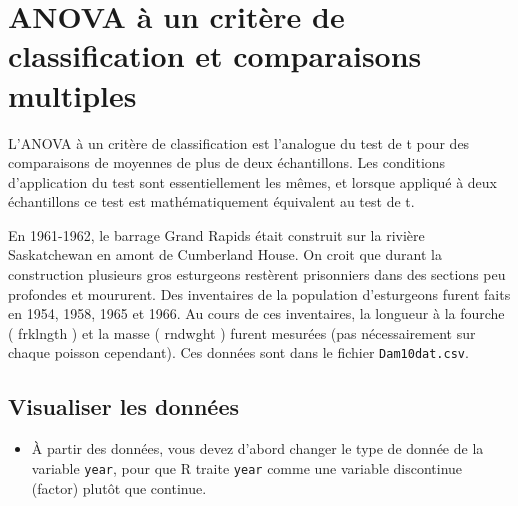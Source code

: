 \documentclass[12pt,]{book}
\newenvironment{Shaded}{\begin{snugshade}}{\end{snugshade}}
\newcommand{\KeywordTok}[1]{\textcolor[rgb]{0.27,0.27,0.27}{\textbf{#1}}}
\newcommand{\NormalTok}[1]{#1}
\newcommand{\OperatorTok}[1]{\textcolor[rgb]{0.43,0.43,0.43}{\textbf{#1}}}
\newcommand{\StringTok}[1]{\textcolor[rgb]{0.5,0.5,0.5}{#1}}
\providecommand{\tightlist}{%
  \setlength{\itemsep}{0pt}\setlength{\parskip}{0pt}}
\begin{document}
\hypertarget{anova-uxe0-un-crituxe8re-de-classification-et-comparaisons-multiples}{%
\section{ANOVA à un critère de classification et comparaisons multiples}\label{anova-uxe0-un-crituxe8re-de-classification-et-comparaisons-multiples}}

L'ANOVA à un critère de classification est l'analogue du test de t pour des comparaisons de moyennes de plus de deux échantillons. Les conditions d'application du test sont essentiellement les mêmes, et lorsque appliqué à deux échantillons ce test est mathématiquement équivalent au test de t.

En 1961-1962, le barrage Grand Rapids était construit sur la rivière Saskatchewan en amont de Cumberland House. On croit que durant la construction plusieurs gros esturgeons restèrent prisonniers dans des sections peu profondes et moururent. Des inventaires de la population d'esturgeons furent faits en 1954, 1958, 1965 et 1966. Au cours de ces inventaires, la longueur à la fourche ( frklngth ) et la masse ( rndwght ) furent mesurées (pas nécessairement sur chaque poisson cependant). Ces données sont dans le fichier \texttt{Dam10dat.csv}.

\hypertarget{visualiser-les-donnuxe9es}{%
\subsection{Visualiser les données}\label{visualiser-les-donnuxe9es}}

\begin{itemize}
\tightlist
\item
  À partir des données, vous devez d'abord changer le type de donnée de la variable \texttt{year}, pour que R traite \texttt{year} comme une variable discontinue (factor) plutôt que continue.
\end{itemize}

\begin{Shaded}
\end{Shaded}
\end{document}
